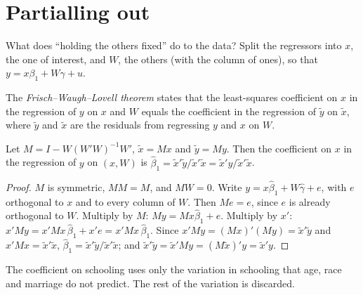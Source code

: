 \section{Partialling out}\label{sec:b2:multiple-regression:fwl}

What does ``holding the others fixed'' do to the data? Split the regressors into $x$, the one of interest, and $W$, the
others (with the column of ones), so that $y = x\beta_1 + W\gamma + u$.

\begin{definition}\label{def:b2:multiple-regression:fwl}
The \emph{Frisch--Waugh--Lovell theorem} states that the least-squares coefficient
on $x$ in the regression of $y$ on $x$ and $W$ equals the coefficient in the regression of $\tilde y$ on $\tilde x$, where
$\tilde y$ and $\tilde x$ are the residuals from regressing $y$ and $x$ on $W$.
\end{definition}

\begin{proposition}\label{prop:b2:multiple-regression:fwl}
Let $M = I - W(W'W)^{-1}W'$, $\tilde x = Mx$ and $\tilde y = My$. Then the coefficient on $x$ in the regression of $y$ on
$(x, W)$ is $\hat\beta_1 = \tilde x'\tilde y/\tilde x'\tilde x = \tilde x'y/\tilde x'\tilde x$.
\end{proposition}

\begin{proof}
$M$ is symmetric, $MM = M$, and $MW = 0$. Write $y = x\hat\beta_1 + W\hat\gamma + e$, with $e$ orthogonal to $x$ and to
every column of $W$. Then $Me = e$, since $e$ is already orthogonal to $W$. Multiply by $M$: $My = Mx\hat\beta_1 + e$.
Multiply by $x'$: $x'My = x'Mx\,\hat\beta_1 + x'e = x'Mx\,\hat\beta_1$. Since $x'My = (Mx)'(My) = \tilde x'\tilde y$ and
$x'Mx = \tilde x'\tilde x$, $\hat\beta_1 = \tilde x'\tilde y/\tilde x'\tilde x$; and $\tilde x'\tilde y = \tilde x'My =
(M\tilde x)'y = \tilde x'y$.
\end{proof}

The coefficient on schooling uses only the variation in schooling that age, race and marriage do not predict. The rest of
the variation is discarded.

\label{lst:b2:multiple-regression:fwl}

\label{out:b2:multiple-regression:fwl}

